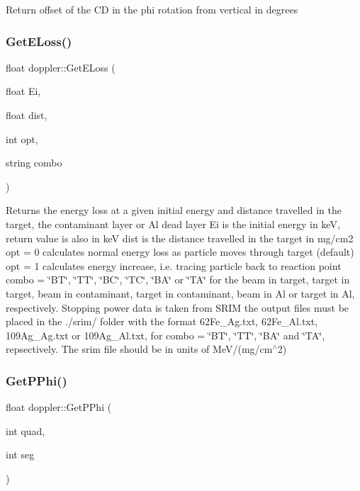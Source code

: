 Return offset of the CD in the phi rotation from vertical in degrees \mbox{\label{classdoppler_a64570ec784dabd6e17cf836489450527}} 
\subsubsection{\texorpdfstring{Get\+E\+Loss()}{GetELoss()}}
{\footnotesize\ttfamily float doppler\+::\+Get\+E\+Loss (\begin{DoxyParamCaption}\item[{float}]{Ei,  }\item[{float}]{dist,  }\item[{int}]{opt,  }\item[{string}]{combo }\end{DoxyParamCaption})}

Returns the energy loss at a given initial energy and distance travelled in the target, the contaminant layer or Al dead layer Ei is the initial energy in keV, return value is also in keV dist is the distance travelled in the target in mg/cm2 opt = 0 calculates normal energy loss as particle moves through target (default) opt = 1 calculates energy increase, i.\+e. tracing particle back to reaction point combo = \char`\"{}\+B\+T\char`\"{}, \char`\"{}\+T\+T\char`\"{}, \char`\"{}\+B\+C\char`\"{}, \char`\"{}\+T\+C\char`\"{}, \char`\"{}\+B\+A\char`\"{} or \char`\"{}\+T\+A\char`\"{} for the beam in target, target in target, beam in contaminant, target in contaminant, beam in Al or target in Al, respectively. Stopping power data is taken from S\+R\+IM the output files must be placed in the \textquotesingle{}./srim/\textquotesingle{} folder with the format 62\+Fe\+\_\+Ag.\+txt, 62\+Fe\+\_\+\+Al.\+txt, 109\+Ag\+\_\+Ag.\+txt or 109\+Ag\+\_\+\+Al.\+txt, for combo = \char`\"{}\+B\+T\char`\"{}, \char`\"{}\+T\+T\char`\"{}, \char`\"{}\+B\+A\char`\"{} and \char`\"{}\+T\+A\char`\"{}, repsectively. The srim file should be in units of Me\+V/(mg/cm$^\wedge$2) \mbox{\label{classdoppler_a0f57a8f4a8c369c14d52e62dd3833f2e}} 
\subsubsection{\texorpdfstring{Get\+P\+Phi()}{GetPPhi()}\hspace{0.1cm}{\footnotesize\ttfamily [1/2]}}
{\footnotesize\ttfamily float doppler\+::\+Get\+P\+Phi (\begin{DoxyParamCaption}\item[{int}]{quad,  }\item[{int}]{seg }\end{DoxyParamCaption})}

